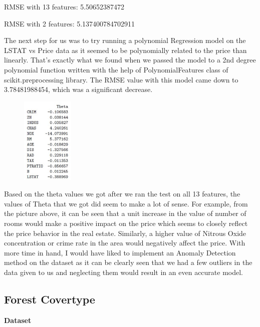 \documentclass[conference]{IEEEtran}
\begin{document}
RMSE with 13 features: 5.50652387472

RMSE with 2 features: 5.137400784702911

The next step for us was to try running a polynomial Regression model on the LSTAT vs Price data as it seemed to be polynomially related to the price than linearly. That’s exactly what we found when we passed the model to a 2nd degree polynomial function written with the help of PolynomialFeatures class of scikit.preprocessing library. The RMSE value with this model came down to 3.78481988454, which was a significant decrease.

\begin{figure}[htbp]
\centerline{\includegraphics[width=25mm,scale=0.5]{imgs/theta}}
\label{fig}
\end{figure}

Based on the theta values we got after we ran the test on all 13 features, the values of Theta that we got did seem to make a lot of sense. For example, from the picture above, it can be seen that a unit increase in the value of number of rooms would make a positive impact on the price which seems to closely reflect the price behavior in the real estate. Similarly, a higher value of Nitrous Oxide concentration or crime rate in the area would negatively affect the price. With more time in hand, I would have liked to implement an Anomaly Detection method on the dataset as it can be clearly seen that we had a few outliers in the data given to us and neglecting them would result in an even accurate model.


\subsection{Forest Covertype}
\noindent \textbf{Dataset}
\end{document}
